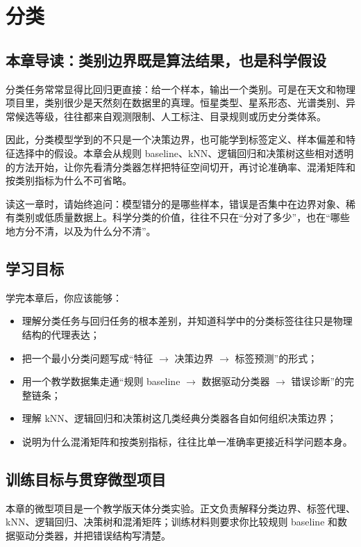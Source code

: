 \chapter{分类}

\section{本章导读：类别边界既是算法结果，也是科学假设}

分类任务常常显得比回归更直接：给一个样本，输出一个类别。可是在天文和物理项目里，类别很少是天然刻在数据里的真理。恒星类型、星系形态、光谱类别、异常候选等级，往往都来自观测限制、人工标注、目录规则或历史分类体系。

因此，分类模型学到的不只是一个决策边界，也可能学到标签定义、样本偏差和特征选择中的假设。本章会从规则 baseline、kNN、逻辑回归和决策树这些相对透明的方法开始，让你先看清分类器怎样把特征空间切开，再讨论准确率、混淆矩阵和按类别指标为什么不可省略。

读这一章时，请始终追问：模型错分的是哪些样本，错误是否集中在边界对象、稀有类别或低质量数据上。科学分类的价值，往往不只在“分对了多少”，也在“哪些地方分不清，以及为什么分不清”。

\section{学习目标}

学完本章后，你应该能够：

\begin{itemize}
    \item 理解分类任务与回归任务的根本差别，并知道科学中的分类标签往往只是物理结构的代理表达；
    \item 把一个最小分类问题写成“特征 $\rightarrow$ 决策边界 $\rightarrow$ 标签预测”的形式；
    \item 用一个教学数据集走通“规则 baseline $\rightarrow$ 数据驱动分类器 $\rightarrow$ 错误诊断”的完整链条；
    \item 理解 kNN、逻辑回归和决策树这几类经典分类器各自如何组织决策边界；
    \item 说明为什么混淆矩阵和按类别指标，往往比单一准确率更接近科学问题本身。
\end{itemize}

\section{训练目标与贯穿微型项目}

本章的微型项目是一个教学版天体分类实验。正文负责解释分类边界、标签代理、kNN、逻辑回归、决策树和混淆矩阵；训练材料则要求你比较规则 baseline 和数据驱动分类器，并把错误结构写清楚。


